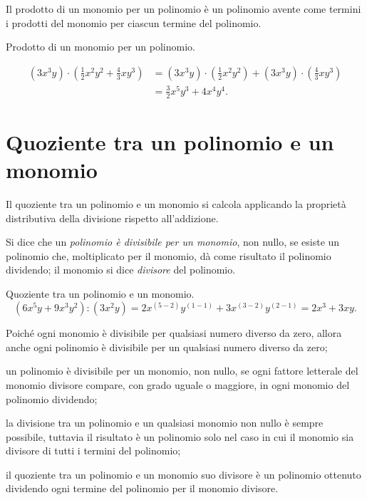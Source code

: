 \osservazione Il prodotto di un monomio per un polinomio è
un polinomio avente come termini i prodotti del monomio per ciascun
termine del polinomio.

\begin{exrig}
 \begin{esempio}
 Prodotto di un monomio per un polinomio.

 \begin{equation*}
\begin{split}
 \left(3x^{3}y\right)\cdot\left(\frac{1}{2}x^{2}y^{2}+\frac{4}{3}{xy}^{3}\right)&=\left(3x^{3}y\right)\cdot\left(\frac{1}{2}x^{2}y^{2}\right)+\left(3x^{3}y\right)\cdot%
\left(\frac{4}{3}{xy}^{3}\right)\\
&=\frac{3}{2}x^{5}y^{3}+4x^{4}y^{4}.
\end{split}
\end{equation*}
 \end{esempio}
\end{exrig}

\ovalbox{\risolvii \ref{ese:11.18}, \ref{ese:11.19}}

\section{Quoziente tra un polinomio e un monomio}

Il quoziente tra un polinomio e un monomio si calcola applicando la
proprietà distributiva della divisione rispetto
all'addizione.

\begin{definizione}
 Si dice che un \emph{polinomio è divisibile per un monomio}, non
nullo, se esiste un polinomio che, moltiplicato per il monomio, dà
come risultato il polinomio dividendo; il monomio si dice
\emph{divisore} del polinomio.
\end{definizione}

\begin{exrig}
 \begin{esempio}
 Quoziente tra un polinomio e un monomio.
 \[\left(6x^{5}y+9x^{3}y^{2}\right):\left(3x^{2}y\right)=2x^{(5-2)}y^{(1-1)}+3x^{(3-2)}y^{(2-1)}=2x^{3}+3{xy}.\]
 \end{esempio}
\end{exrig}
\osservazione

\begin{enumeratea}
\item Poiché ogni monomio è divisibile per qualsiasi numero diverso
da zero, allora anche ogni polinomio è divisibile per un qualsiasi
numero diverso da zero;
\item un polinomio è divisibile per un monomio, non nullo, se ogni
fattore letterale del monomio divisore compare, con grado uguale o
maggiore, in ogni monomio del polinomio dividendo;
\item la divisione tra un polinomio e un qualsiasi monomio non nullo è
sempre possibile, tuttavia il risultato è un polinomio solo nel caso
in cui il monomio sia divisore di tutti i termini del polinomio;
\item il quoziente tra un polinomio e un monomio suo divisore è un
polinomio ottenuto dividendo ogni termine del polinomio per il monomio
divisore.
\end{enumeratea}

